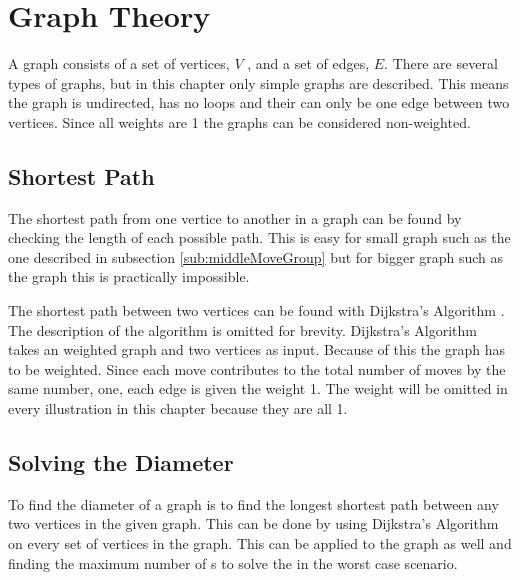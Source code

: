 \chapter {Graph Theory}
\label{chap:graphTheory}

A graph consists of a set of vertices, $V$ \cite[p. 592]{Rosen07}, and a set of edges, $E$. There are several types of graphs, but in this chapter only simple graphs are described. This means the graph is undirected, has no loops and their can only be one edge between two vertices. Since all weights are 1 the graphs can be considered non-weighted.

\section{Shortest Path}
The shortest path from one vertice to another in a graph can be found by checking the length of each possible path. This is easy for small graph such as the one described in subsection \ref{sub:middleMoveGroup} but for bigger graph such as the \rubik{} graph this is practically impossible. 

The shortest path between two vertices can be found with Dijkstra's Algorithm \cite[p. 651]{Rosen07}. The description of the algorithm is omitted for brevity. Dijkstra's Algorithm takes an weighted graph and two vertices as input. Because of this the \rubik{} graph has to be weighted. Since each move contributes to the total number of moves by the same number, one, each edge is given the weight 1. The weight will be omitted in every illustration in this chapter because they are all 1.  

\section{Solving the Diameter}
To find the diameter of a graph is to find the longest shortest path between any two vertices in the given graph. This can be done by using Dijkstra's Algorithm on every set of vertices in the graph. This can be applied to the \rubik{} graph as well and finding the maximum number of \twist{}s to solve the \rubik{} in the worst case scenario. %

